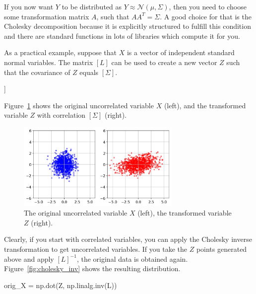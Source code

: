 If you now want $Y$ to be distributed as $Y\approx\mathcal{N}(\mu,\Sigma)$, then you need to choose some transformation matrix $A$, such that $AA^{T}=\Sigma$. A good choice for that is the Cholesky decomposition because it is explicitly structured to fulfill this condition and there are standard functions in lots of libraries which compute it for you.

As a practical example, suppose that $X$ is a vector of independent standard normal variables. The matrix $[L]$ can be used to create a new vector $Z$ such that the covariance of $Z$ equals $[\Sigma]$.


\begin{ioutput}
[[1.73205081 0.        ]
 [0.57735027 0.81649658]]
\end{ioutput}

Figure~\ref{fig:cholesky_norm} shows the original uncorrelated variable $X$ (left), and the transformed variable $Z$ with correlation $[\Sigma]$ (right).

\begin{figure}[htbp]
\centering
\includegraphics[width=0.7\textwidth]{figures/cholesky_norm}
\caption{The original uncorrelated variable $X$ (left), the transformed variable $Z$ (right).}
\label{fig:cholesky_norm}
\end{figure}

Clearly, if you start with correlated variables, you can apply the Cholesky inverse transformation to get uncorrelated variables.
If you take the $Z$ points generated above and apply $[L]^{-1}$, the original data is obtained again. Figure~\ref{fig:cholesky_inv} shows the resulting distribution.

\begin{ipythonnon}
orig_X = np.dot(Z, np.linalg.inv(L))
\end{ipythonnon}

